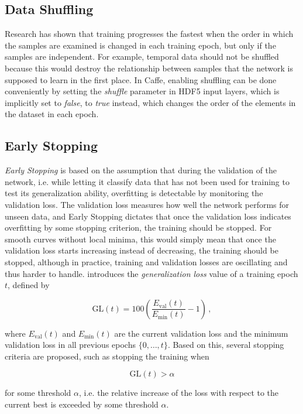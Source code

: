 	\subsection{Data Shuffling}
Research \cite{shuffling, lecun_norm} has shown that training progresses the fastest when the order in which the samples are examined is changed in each training epoch, but only if the samples are independent. For example, temporal data should not be shuffled because this would destroy the relationship between samples that the network is supposed to learn in the first place. In Caffe, enabling shuffling can be done conveniently by setting the \textit{shuffle} parameter in HDF5 input layers, which is implicitly set to \textit{false}, to \textit{true} instead, which changes the order of the elements in the dataset in each epoch.


	\subsection{Early Stopping}
\textit{Early Stopping} is based on the assumption that during the validation of the network, i.e. while letting it classify data that has not been used for training to test its generalization ability, overfitting is detectable by monitoring the validation loss. The validation loss measures how well the network performs for unseen data, and Early Stopping dictates that once the validation loss indicates overfitting by some stopping criterion, the training should be stopped. For smooth curves without local minima, this would simply mean that once the validation loss starts increasing instead of decreasing, the training should be stopped, although in practice, training and validation losses are oscillating and thus harder to handle. \cite{early_stopping} introduces the \textit{generalization loss} value of a training epoch $t$, defined by

\[ \text{GL}(t) = 100 \left ( \frac{E_{\text{val}}(t)}{E_{\text{min}}(t)} - 1 \right ) \,, \]

\noindent where $E_{\text{val}}(t)$ and $E_{\text{min}}(t)$ are the current validation loss and the minimum validation loss in all previous epochs $\{0, \dots, t\}$. Based on this, several stopping criteria are proposed, such as stopping the training when 

\[ \text{GL}(t) > \alpha \]

\noindent for some threshold $\alpha$, i.e. the relative increase of the loss with respect to the current best is exceeded by some threshold $\alpha$.\\

